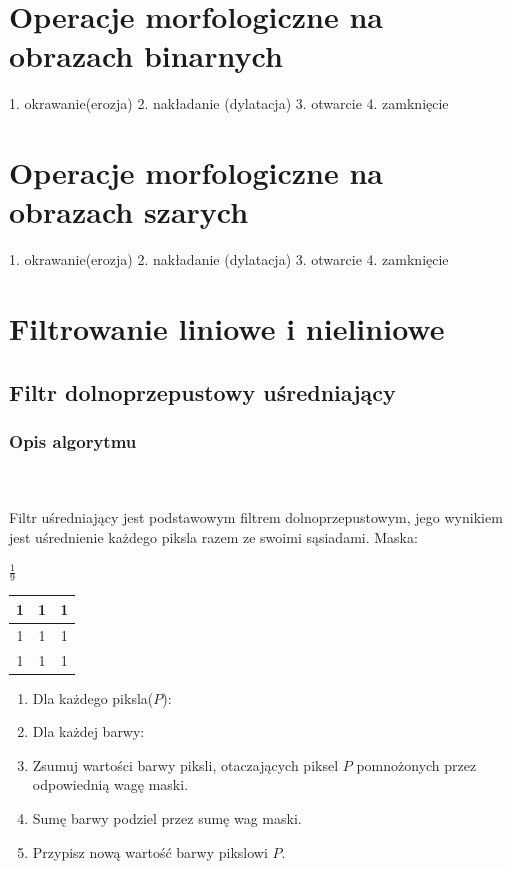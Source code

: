 \documentclass[final,a4paper,openany,12pt]{mwbk}
\begin{document}
\newpage





\chapter{Operacje morfologiczne na obrazach binarnych}
1. okrawanie(erozja)
2. nakładanie (dylatacja)
3. otwarcie
4. zamknięcie

\chapter {Operacje morfologiczne na obrazach szarych}
1. okrawanie(erozja)
2. nakładanie (dylatacja)
3. otwarcie
4. zamknięcie

\chapter {Filtrowanie liniowe i nieliniowe}
\newpage


\section{Filtr dolnoprzepustowy uśredniający}
\subsection*{Opis algorytmu}
\hfill
\\\\
\indent Filtr uśredniający jest podstawowym filtrem dolnoprzepustowym, jego wynikiem jest uśrednienie każdego piksla razem ze swoimi sąsiadami. Maska:
\begin{center}
	$\frac{1}{9}$ 
	\begin{tabular}{|c|c|c|}
		\hline
		1 & 1 & 1\\
		\hline
		1 & 1 & 1\\
		\hline
		1 & 1 & 1\\
		\hline
	\end{tabular}
\end{center}

\begin{enumerate}
	\item Dla każdego piksla($P$):
	\item Dla każdej barwy:
	\item Zsumuj wartości barwy piksli, otaczających piksel $P$ pomnożonych przez odpowiednią wagę maski.
	\item Sumę barwy podziel przez sumę wag maski.
	\item Przypisz nową wartość barwy pikslowi $P$.
\end{enumerate}
\end{document}
